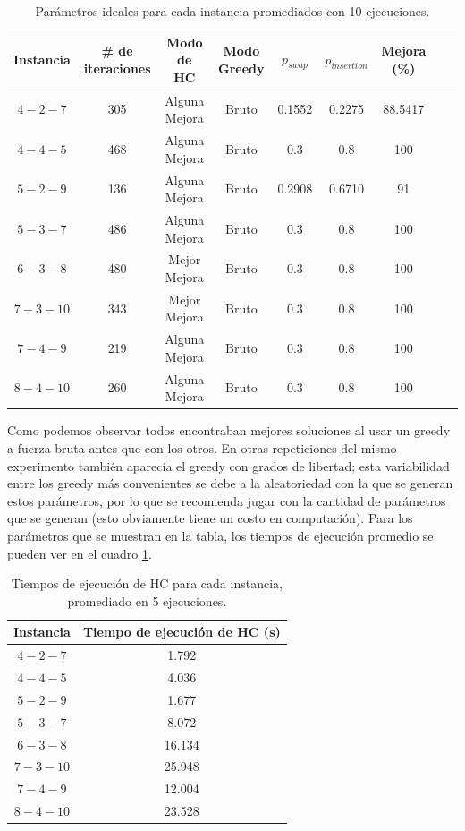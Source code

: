 \documentclass[letter, 10pt]{article}
\begin{document}
\begin{center}
\begin{table}[!h]
\begin{tabular}{|c|c|c|c|c|c|c|c|c|}
\hline
   Instancia  & \# de iteraciones & Modo de HC & Modo Greedy  & $p_{swap}$ & $p_{insertion}$ & Mejora (\%) \\
   \hline
    $4-2-7$ & 305 & Alguna Mejora & Bruto & 0.1552 & 0.2275 & 88.5417 \\
    \hline
    $4-4-5$ & 468 & Alguna Mejora & Bruto & 0.3 & 0.8 & 100\\
    \hline
    $5-2-9$ & 136 & Alguna Mejora & Bruto & 0.2908 & 0.6710 & 91\\
    \hline
    $5-3-7$ & 486 & Alguna Mejora & Bruto & 0.3 & 0.8 & 100 \\
    \hline
    $6-3-8$ & 480 & Mejor Mejora & Bruto & 0.3 & 0.8 & 100 \\
    \hline
    $7-3-10$ & 343 & Mejor Mejora & Bruto & 0.3 & 0.8 & 100 \\
    \hline
    $7-4-9$ & 219 & Alguna Mejora & Bruto & 0.3 & 0.8 & 100 \\
    \hline
    $8-4-10$ & 260 & Alguna Mejora & Bruto & 0.3 & 0.8 & 100 \\
    \hline
\end{tabular}
\caption{Parámetros ideales para cada instancia promediados con 10 ejecuciones.}
\end{table}
\end{center}

Como podemos observar todos encontraban mejores soluciones al usar un greedy a fuerza bruta antes que con los otros. En otras repeticiones del mismo experimento también aparecía el greedy con grados de libertad; esta variabilidad entre los greedy más convenientes se debe a la aleatoriedad con la que se generan estos parámetros, por lo que se recomienda jugar con la cantidad de parámetros que se generan (esto obviamente tiene un costo en computación). Para los parámetros que se muestran en la tabla, los tiempos de ejecución promedio se pueden ver en el cuadro \ref{table:2}.

\begin{center}
\begin{table}[!h]
\centering
    \begin{tabular}{c|c}
        Instancia & Tiempo de ejecución de HC (s) \\
    \hline
         $4-2-7$ & 1.792 \\
         $4-4-5$ & 4.036\\
         $5-2-9$ & 1.677 \\
         $5-3-7$ & 8.072\\
         $6-3-8$ & 16.134 \\
         $7-3-10$ & 25.948 \\
         $7-4-9$ & 12.004 \\
         $8-4-10$ & 23.528
    \end{tabular}
    \caption{Tiempos de ejecución de HC para cada instancia, promediado en 5 ejecuciones.}
    \label{table:2}
\end{table}
\end{center}
\end{document}
